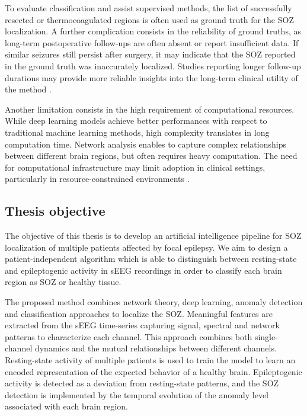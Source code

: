 To evaluate classification and assist supervised methods, the list of successfully resected or
thermocoagulated regions is often used as ground truth for the SOZ localization.
A further complication consists in the reliability of ground truths, as 
long-term postoperative follow-ups are often absent or report insufficient data.
If similar seizures still persist after surgery, it may indicate that the SOZ
reported in the ground truth was inaccurately localized. 
Studies reporting longer follow-up durations may provide more reliable insights 
into the long-term clinical utility of the method \cite{ep-rev}.

Another limitation consists in the high requirement of computational resources.
While deep learning models achieve better performances with respect to 
traditional machine learning methods, high complexity translates in long
computation time.
Network analysis enables to capture complex relationships between different
brain regions, but often requires heavy computation.
The need for computational infrastructure may limit adoption in clinical 
settings, particularly in resource-constrained environments \cite{ep-rev}. 

\subsection{Thesis objective}

The objective of this thesis is to develop an artificial intelligence pipeline
for SOZ localization of multiple patients affected by focal epilepsy.
We aim to design a patient-independent algorithm which is able to distinguish 
between resting-state and epileptogenic activity in sEEG recordings in order to
classify each brain region as SOZ or healthy tissue.

The proposed method combines network theory, deep learning, anomaly detection
and classification approaches to localize the SOZ.
Meaningful features are extracted from the sEEG time-series capturing signal,
spectral and network patterns to characterize each channel.
This approach combines both single-channel dynamics and the mutual
relationships between different channels.
Resting-state activity of multiple patients is used to train the model to learn
an encoded representation of the expected behavior of a healthy brain.
Epileptogenic activity is detected as a deviation from resting-state patterns,
and the SOZ detection is implemented by the temporal evolution of the anomaly
level associated with each brain region.

